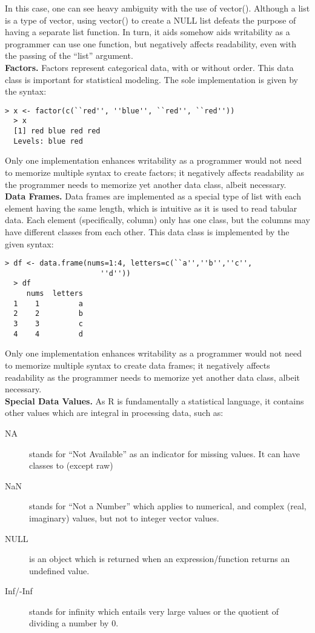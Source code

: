 \documentclass[12pt]{article}
\begin{document}
In this case, one can see heavy ambiguity with the use of vector(). Although a list is a type of vector, using vector() to create a NULL list defeats the purpose of having a separate list function. In turn, it aids somehow aids writability as a programmer can use one function, but negatively affects readability, even with the passing of the ``list'' argument.\\

\textbf{Factors.} Factors represent categorical data, with or without order. This data class is important for statistical modeling. The sole implementation is given by the syntax:

\begin{lstlisting}[frame=single]
  > x <- factor(c(``red'', ''blue'', ``red'', ``red''))
  > x
  [1] red blue red red
  Levels: blue red
\end{lstlisting}

Only one implementation enhances writability as a programmer would not need to memorize multiple syntax to create factors; it negatively affects readability as the programmer needs to memorize yet another data class, albeit necessary.\\

\textbf{Data Frames.} Data frames are implemented as a special type of list with each element having the same length, which is intuitive as it is used to read tabular data. Each element (specifically, column) only has one class, but the columns may have different classes from each other. This data class is implemented by the given syntax:

\begin{lstlisting}[frame=single]
  > df <- data.frame(nums=1:4, letters=c(``a'',''b'',''c'',
                      ''d''))
  > df
     nums  letters
  1    1         a
  2    2         b
  3    3         c
  4    4         d
\end{lstlisting}

Only one implementation enhances writability as a programmer would not need to memorize multiple syntax to create data frames; it negatively affects readability as the programmer needs to memorize yet another data class, albeit necessary.\\

\textbf{Special Data Values.} As R is fundamentally a statistical language, it contains other values which are integral in processing data, such as:
\begin{description}
\item[NA] stands for ``Not Available'' as an indicator for missing values. It can have classes to (except raw)
\item[NaN] stands for ``Not a Number'' which applies to numerical, and complex (real, imaginary) values, but not to integer vector values.
\item[NULL] is an object which is returned when an expression/function returns an undefined value.
\item[Inf/-Inf] stands for infinity which entails very large values or the quotient of dividing a number by 0.
\end{description}
\end{document}
